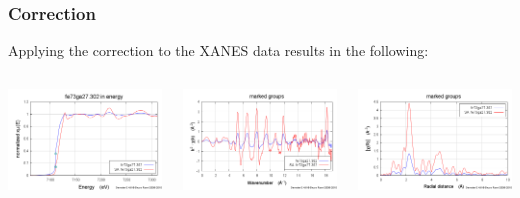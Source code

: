 \documentclass[10pt, xcolor=x11names, compress, handout]{beamer}
\begin{document}
\begin{frame}
  \frametitle{Correction}
  Applying the correction to the XANES data results in the following:

  \bigskip

  \begin{columns}
    \begin{column}{0.33\linewidth}
      \includegraphics[width=\linewidth]{images/fega_mu.png}
    \end{column}
    \begin{column}{0.33\linewidth}
      \includegraphics[width=\linewidth]{images/fega_chik.png}
    \end{column}
    \begin{column}{0.33\linewidth}
      \includegraphics[width=\linewidth]{images/fega_chir.png}

\end{column}
\end{columns}
\end{frame}
\end{document}
